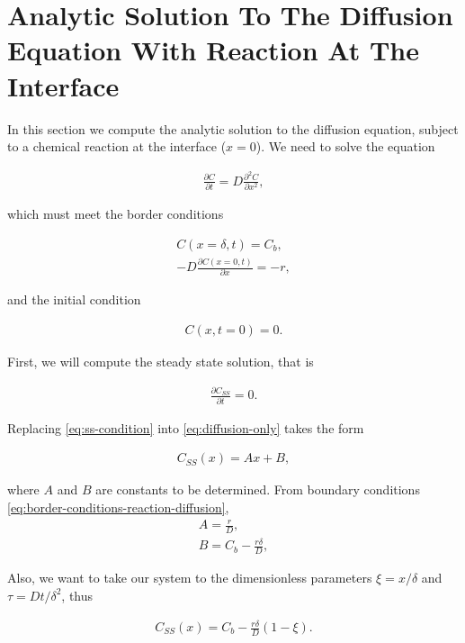 \section{Analytic Solution To The Diffusion Equation With Reaction At The Interface}
\label{appendix:diffusion-reaction-only}

In this section we compute the analytic solution to the diffusion equation, subject to a chemical reaction at the interface ($x = 0$).
We need to solve the equation

\begin{align}
	\frac{\partial C}{\partial t} = D\frac{\partial^2 C}{\partial x^2},
\end{align}

which must meet the border conditions

\begin{align}
\label{eq:border-conditions-reaction-diffusion}
	C(x = \delta, t) = C_b,\\
	-D\frac{\partial C(x = 0, t)}{\partial x} = -r,
\end{align}

and the initial condition

\begin{align}
	C(x, t = 0) = 0.
\end{align}

First, we will compute the steady state solution, that is

\begin{align}
\label{eq:ss-condition}
	\frac{\partial C_{SS}}{\partial t} = 0.
\end{align}

Replacing \ref{eq:ss-condition} into \ref{eq:diffusion-only} takes the form

\begin{align}
	C_{SS}(x) = Ax+B,
\end{align}

where $A$ and $B$ are constants to be determined. From boundary conditions \ref{eq:border-conditions-reaction-diffusion},
\begin{align}
	A = \frac{r}{D},\\
	B = C_b - \frac{r\delta}{D},
\end{align}

Also, we want to take our system to the dimensionless parameters $\xi = x/\delta$ and $\tau = D t / \delta^2$, thus

\begin{align}
	C_{SS}(x) = C_b - \frac{r\delta}{D}(1-\xi).
\end{align}

